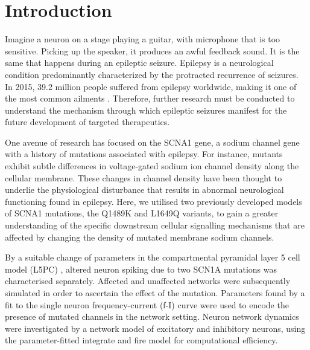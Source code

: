\section{Introduction}

Imagine a neuron on a stage playing a guitar, with microphone that is too sensitive. Picking
up the  speaker, it produces an awful feedback sound. It is the same that happens during an
epileptic seizure. Epilepsy is a neurological condition predominantly characterized by the
protracted recurrence of seizures. In 2015, 39.2 million people suffered from epilepsy worldwide,
making it one of the most common ailments \cite{vos2016global}. Therefore, further research must be
conducted to understand the mechanism through which epileptic seizures manifest for the future
development of targeted therapeutics.

One avenue of research has focused on the SCNA1 gene, a sodium channel gene
with a history of mutations associated with epilepsy. For instance, mutants exhibit subtle
differences in voltage-gated sodium ion channel density along the cellular membrane. These changes
in channel density have been thought to underlie the physiological disturbance that results in
abnormal neurological functioning found in epilepsy. Here, we utilised two previously developed
models of SCNA1 mutations, the Q1489K and L1649Q variants, to gain a greater understanding of the
specific downstream cellular signalling mechanisms that are affected by changing the density of
mutated membrane sodium channels.

By a suitable change of parameters in the compartmental pyramidal layer 5 cell model (L5PC)
\cite{hay2011models}, altered neuron spiking due to two SCN1A mutations was characterised
separately. Affected and unaffected networks were subsequently simulated in order to ascertain the
effect of the mutation. Parameters found by a fit to the single neuron frequency-current (f-I) curve
were used to encode the presence of mutated channels in the network setting. Neuron network dynamics
were investigated by a network model of excitatory and inhibitory neurons, using the
parameter-fitted integrate and fire model for computational efficiency.


